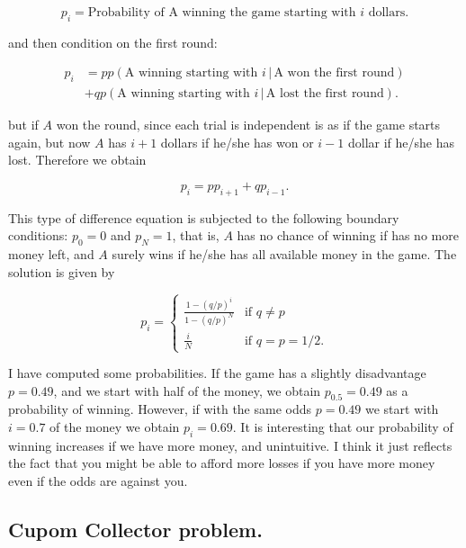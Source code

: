 \documentclass[12pt]{article}
\begin{document}
\begin{equation}
p_{i} = \text{Probability of A winning the game starting with } i \text{ dollars.}
\end{equation}

\noindent
and then condition on the first round:

\begin{align}
p_{i} &= p p( \text{A winning starting with } i \, | \, \text{A won the first round} ) 
\nonumber \\
&+ q p( \text{A winning starting with } i \, | \, \text{A lost the first round} ).
\end{align}

\noindent
but if $A$ won the round, since each trial is independent is as if the game starts again, but 
now $A$ has $i + 1$ dollars if he/she has won or $i - 1$ dollar if he/she has lost.
Therefore we obtain

\begin{equation}
p_{i} = p p_{i + 1} + q p_{i - 1}.
\end{equation}

\noindent
This type of difference equation is subjected to the following boundary conditions:
$p_{0} = 0$ and $p_{N} = 1$, that is, $A$ has no chance of winning if has no more money left,
and $A$ surely wins if he/she has all available money in the game.
The solution is given by

\begin{equation}
p_{i} = 
\begin{cases}
\frac{1 - (q/p)^{i}}{ 1 - (q/p)^{N}} &\mbox{if } q \neq p
\\
\frac{i}{N} &\mbox{if } q = p = 1/2.
\end{cases}
\end{equation}

\noindent
I have computed some probabilities.
If the game has a slightly disadvantage $p = 0.49$, and we start with half of the money, we obtain
$p_{0.5} = 0.49$ as a probability of winning.
However, if with the same odds $p=0.49$ we start with $i = 0.7$ of the money we obtain
$p_{i} = 0.69$. It is interesting that our probability of winning increases if we have more money,
and unintuitive. I think it just reflects the fact that you might be able to afford more losses
if you have more money even if the odds are against you.

\subsection{Cupom Collector problem.}
\end{document}

